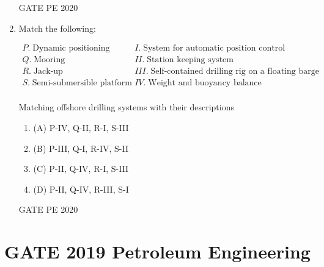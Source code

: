 \documentclass[journal,12pt,onecolumn]{IEEEtran}
\theoremstyle{remark}
\begin{document}
\begin{enumerate}
  \hfill{GATE PE 2020}
   
\item Match the following:

\begin{table}[h!]
\centering
\[
\begin{array}{ll}
P.\; \text{Dynamic positioning} & I.\; \text{System for automatic position control} \\
Q.\; \text{Mooring}             & II.\; \text{Station keeping system} \\
R.\; \text{Jack-up}             & III.\; \text{Self-contained drilling rig on a floating barge} \\
S.\; \text{Semi-submersible platform} & IV.\; \text{Weight and buoyancy balance} \\
\end{array}
\]
\caption{Matching offshore drilling systems with their descriptions}
\label{tab:offshore}
\end{table}


  
\begin{multicols}{2}
\begin{enumerate}
\item (A) P-IV, Q-II, R-I, S-III
\item (B) P-III, Q-I, R-IV, S-II
\item (C) P-II, Q-IV, R-I, S-III
\item (D) P-II, Q-IV, R-III, S-I
\end{enumerate}
\end{multicols}


  \hfill{GATE PE 2020}
   
\end{enumerate}


\section*{GATE 2019 Petroleum Engineering}
\end{document}
